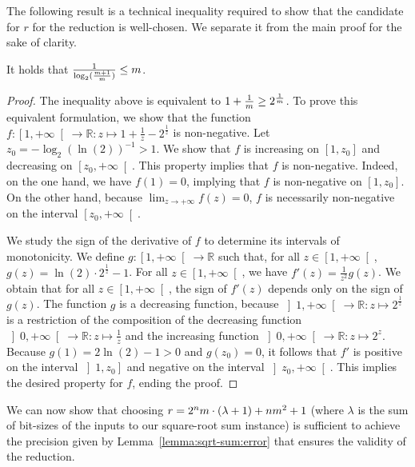 \documentclass[a4paper,UKenglish,cleveref,autoref,thm-restate,colorlinks]{lipics-v2021}
\newcommand{\ooInt}[2]{\left]#1, #2\right[}
\newcommand{\ccInt}[2]{\left[#1, #2\right]}
\newcommand{\ocInt}[2]{\left]#1, #2\right]}
\newcommand{\coInt}[2]{\left[#1, #2\right[}
\newcommand{\IR}{\mathbb{R}}
\newcommand{\counterUB}{r}
\begin{document}
The following result is a technical inequality required to show that the candidate for $\counterUB$ for the reduction is well-chosen.
We separate it from the main proof for the sake of clarity.
\begin{lemma}\label{lemma:sqrt-sum:bound:ub:inequality}
  It holds that $\frac{1}{\log_2(\frac{m+1}{m})}\leq m$.
\end{lemma}
\begin{proof}
  The inequality above is equivalent to $1+\frac{1}{m}\geq 2^{\frac{1}{m}}$.
  To prove this equivalent formulation, we show that the function $f\colon\coInt{1}{+\infty}\to\IR\colon z\mapsto 1 + \frac{1}{z} - 2^{\frac{1}{z}}$ is non-negative.
  Let $z_0 = -\log_2(\ln(2))^{-1} > 1$.
  We show that $f$ is increasing on $\ccInt{1}{z_0}$ and decreasing on $\coInt{z_0}{+\infty}$.
  This property implies that $f$ is non-negative.
  Indeed, on the one hand, we have $f(1) = 0$, implying that $f$ is non-negative on $\ccInt{1}{z_0}$.
  On the other hand, because $\lim_{z\to+\infty}f(z) = 0$, $f$ is necessarily non-negative on the interval $\coInt{z_0}{+\infty}$.

  We study the sign of the derivative of $f$ to determine its intervals of monotonicity.
  We define $g\colon\coInt{1}{+\infty}\to\IR$ such that, for all $z\in\coInt{1}{+\infty}$, $g(z) = \ln(2)\cdot 2^{\frac{1}{z}}-1$.
  For all $z\in\coInt{1}{+\infty}$, we have $f'(z) = \frac{1}{z^2}g(z)$.
  We obtain that for all $z\in\coInt{1}{+\infty}$, the sign of $f'(z)$ depends only on the sign of $g(z)$.
  The function $g$ is a decreasing function, because $\ooInt{1}{+\infty}\to\IR\colon z\mapsto 2^{\frac{1}{z}}$ is a restriction of the composition of the decreasing function $\ooInt{0}{+\infty}\to\IR\colon z\mapsto\frac{1}{z}$ and the increasing function $\ooInt{0}{+\infty}\to\IR\colon z\mapsto 2^z$.
  Because $g(1) = 2\ln(2) - 1>0$ and $g(z_0) = 0$, it follows that $f'$ is positive on the interval $\ocInt{1}{z_0}$ and negative on the interval $\ooInt{z_0}{+\infty}$.
  This implies the desired property for $f$, ending the proof.
\end{proof}

We can now show that choosing $\counterUB=2^\sqsn\sqsm\cdot(\lambda+1)+\sqsn\sqsm^2+1$ (where $\lambda$ is the sum of bit-sizes of the inputs to our square-root sum instance) is sufficient to achieve the precision given by Lemma~\ref{lemma:sqrt-sum:error} that ensures the validity of the reduction.
\end{document}
